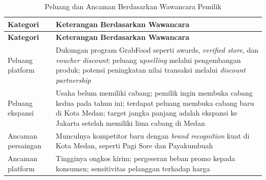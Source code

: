 \begingroup
\begin{xltabular}{\textwidth}{|Z{3.4cm}|Y|}
\caption{Peluang dan Ancaman Berdasarkan Wawancara Pemilik}
\label{tab:peluang_ancaman_wawancara} \\
        \toprule
        \textbf{Kategori}  & \textbf{Keterangan Berdasarkan Wawancara}                                                                                                                                                                                           \\ \hline
        \midrule
\endfirsthead
{}
        \toprule
        \textbf{Kategori}  & \textbf{Keterangan Berdasarkan Wawancara}                                                                                                                                                                                           \\ \hline
        \midrule
\endhead
{}
\endfoot
        \bottomrule
        \endlastfoot
        Peluang platform   & Dukungan program GrabFood seperti awards, \textit{verified store}, dan \textit{voucher discount}; peluang \textit{upselling} melalui pengembangan produk; potensi peningkatan nilai transaksi melalui \textit{discount partnership} \\ \hline
        Peluang ekspansi   & Usaha belum memiliki cabang; pemilik ingin membuka cabang kedua pada tahun ini; terdapat peluang membuka cabang baru di Kota Medan; target jangka panjang adalah ekspansi ke Jakarta setelah memiliki lima cabang di Medan          \\ \hline
        Ancaman persaingan & Munculnya kompetitor baru dengan \textit{brand recognition} kuat di Kota Medan, seperti Pagi Sore dan Payakumbuah                                                                                                                   \\ \hline
        Ancaman platform   & Tingginya ongkos kirim; pergeseran beban promo kepada konsumen; sensitivitas pelanggan terhadap harga                                                                                                                               \\ \hline
        \bottomrule
    
\end{xltabular}
\endgroup

